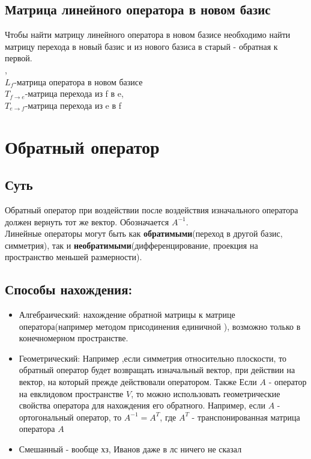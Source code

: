 \documentclass[12pt]{article}
\begin{document}
\subsection{Матрица линейного оператора в новом базис}
Чтобы найти матрицу линейного оператора в новом базисе необходимо найти матрицу перехода в новый базис и из нового базиса в старый - обратная к первой.\\
, \\$L_f$-матрица оператора в новом базисе\\ $T_{f\longrightarrow e}$-матрица перехода из f в e,
    \\$T_{e\longrightarrow f}$-матрица перехода из e в f

\section{Обратный оператор}
\subsection{Суть}
Обратный оператор при воздействии после воздействия изначального оператора должен вернуть тот же вектор. Обозначается $A^{-1}$.\\ Линейные операторы могут быть как \textbf{обратимыми}(переход в другой базис, симметрия), так и \textbf{необратимыми}(дифференцирование, проекция на пространство меньшей размерности).
\subsection{Способы нахождения:}
\begin{itemize}
    \item Алгебраический: нахождение обратной матрицы к матрице оператора(например методом присодинения единичной ), возможно только в конечномерном пространстве.
    \item Геометрический: Например ,если симметрия относительно плоскости, то обратный оператор будет возвращать изначальный вектор, при действии на вектор, на который прежде действовали оператором. Также Если $A$ - оператор на евклидовом пространстве $V$, то можно использовать геометрические свойства оператора для нахождения его обратного. Например, если $A$ - ортогональный оператор, то $A^{-1} = A^T$, где $A^T$ - транспонированная матрица оператора $A$
    \item Смешанный - вообще хз, Иванов даже в лс ничего не сказал
\end{itemize}
\end{document}
